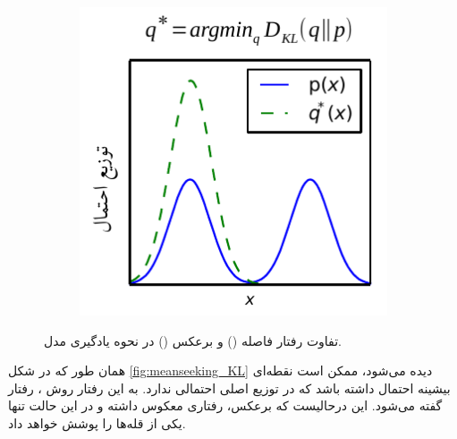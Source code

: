 \begin{figure}[h]
\begin{subfigure}[t!]{.4\textwidth}
        \includegraphics[height=1.\textwidth]{images/KLvsReverseKL_RKL.pdf}
        \caption{}
        \label{fig:meanseeking_RKL}
    \end{subfigure}
    \caption{
        تفاوت رفتار فاصله  () و  برعکس () در نحوه یادگیری مدل.
    }
\end{figure}
همان طور که در شکل \ref{fig:meanseeking_KL} دیده می‌شود، ممکن است نقطه‌ای بیشینه احتمال داشته باشد که در توزیع اصلی احتمالی ندارد. به این رفتار روش \maxlikelihood{}، رفتار \meanseeking{} گفته می‌شود. این درحالیست که  برعکس، رفتاری معکوس داشته و در این حالت تنها یکی از قله‌ها را پوشش خواهد داد.
